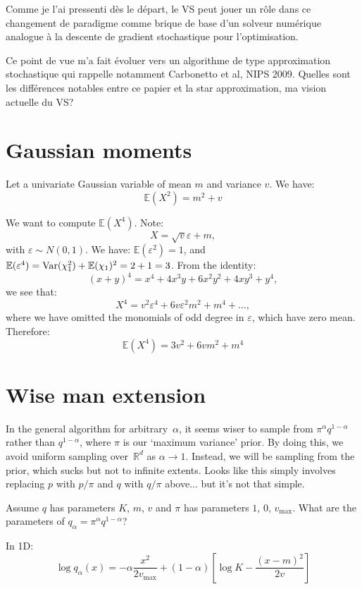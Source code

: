 \documentclass{article}
\def\E{\mathbb{E}}
\begin{document}
Comme je l'ai pressenti d\`es le d\'epart, le VS peut jouer un r\^ole dans ce changement de paradigme comme brique de base d'un solveur num\'erique analogue \`a la descente de gradient stochastique pour l'optimisation. 

Ce point de vue m'a fait \'evoluer vers un algorithme de type approximation stochastique qui rappelle notamment Carbonetto et al, NIPS 2009. Quelles sont les diff\'erences notables entre ce papier et la star approximation, ma vision actuelle du VS? 



\appendix

\section{Gaussian moments}

Let a univariate Gaussian variable of mean $m$ and variance $v$.
We have:
$$
\E(X^2) = m^2 + v
$$

We want to compute $\E(X^4)$. Note:
$$
X = \sqrt{v} \varepsilon + m,
$$
with $\varepsilon\sim N(0,1)$. We have: $\E(\varepsilon^2)=1$, and $\E(\varepsilon^4)={\rm Var}(\chi_1^2)+\E(\chi_1)^2 = 2+1 =3$. 
From the identity:
$$
(x + y)^4 
= x^4 + 4x^3y + 6x^2y^2 + 4xy^3 + y^4,
$$
we see that:
$$
X^4 = v^2 \varepsilon^4 + 6 v \varepsilon^2 m^2 + m^4 + \ldots,
$$
where we have omitted the monomials of odd degree in $\varepsilon$, which have zero mean. Therefore:
$$
\E(X^4) = 3 v^2 + 6 v m^2 + m^4
$$


\section{Wise man extension}

In the general algorithm for arbitrary~$\alpha$, it seems wiser to sample from $\pi^\alpha q^{1-\alpha}$ rather than $q^{1-\alpha}$, where $\pi$ is our `maximum variance' prior. By doing this, we avoid uniform sampling over~$\mathbb{R}^d$ as $\alpha\to 1$. Instead, we will be sampling from the prior, which sucks but not to infinite extents. Looks like this simply involves replacing $p$ with $p/\pi$ and $q$ with $q/\pi$ above... but it's not that simple. 

Assume $q$ has parameters $K$, $m$, $v$ and $\pi$ has parameters $1$, $0$, $v_{\text{max}}$. What are the parameters of $q_\alpha = \pi^\alpha q^{1-\alpha}$? 

In 1D:
$$
\log q_\alpha(x) = -\alpha\frac{x^2}{2v_{\text{max}}} + (1-\alpha)
\left[\log K - \frac{(x-m)^2}{2v} \right]
$$
\end{document}
